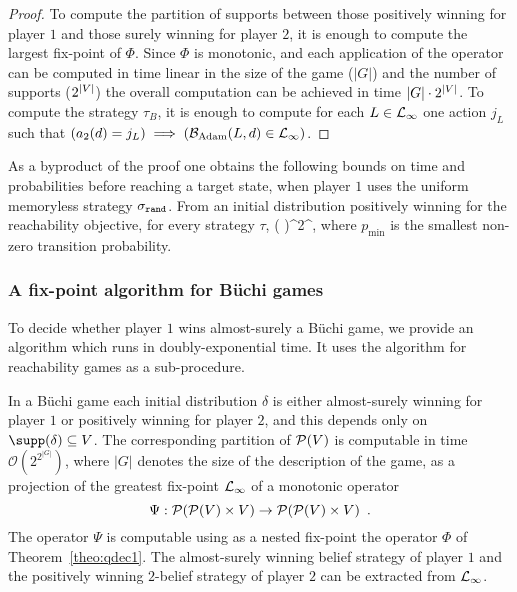 \begin{proof}
To compute
the partition of supports between those positively winning for player $1$
and those surely winning for player $2$,
it is enough to compute
the largest fix-point of $\Phi$.
Since $\Phi$ is monotonic, and each application of the operator
can be computed in time linear in the size of the game ($|G|$)
and the number of supports ($2^{|V|}$)
the overall computation can be achieved in time $|G| \cdot 2^{|V|}$.
To compute the strategy $\tau_B$, it is enough to compute
for each $L\in\mathcal{L}_\infty$ one action $j_L$ such that
$(a_2(d)=j_L)\implies (\mathcal{B}_{\text{Adam}}(L,d)\in\mathcal{L}_\infty)$.
\end{proof}

As a byproduct of the proof one obtains the following bounds on time
and probabilities before reaching a target state, when player $1$ uses
the uniform memoryless strategy $\sigma_{{\tt rand}}$.  From an initial
distribution positively winning for the reachability objective, for
every strategy $\tau$, \be\label{eq:bounds}
\geq \left(
  \right)^{2^{\lvert\states\lvert}}\enspace,
\ee where $p_{\min}$ is the smallest non-zero transition probability.


\subsubsection{A fix-point algorithm for B\"uchi games}

To decide whether player $1$ wins almost-surely a B\"uchi game,
we provide an algorithm which runs in doubly-exponential time.
It uses the algorithm for reachability games as a sub-procedure.


\begin{theorem}
  \label{theo:qdec2} In a B\"uchi game each initial distribution
  $\delta$ is either almost-surely winning for player $1$ or
  positively winning for player $2$, and this depends only on
  $\supp(\delta)\subseteq \states$.
The corresponding partition of $\mathcal{P}(V)$ is computable in
time $\mathcal{O}\left(2^{2^{|G|}}\right)$, where $|G|$ denotes the size of the description of the game,
as a projection of the greatest
fix-point $\mathcal{L}_\infty$
of a monotonic operator
\[\Psi:
\mathcal{P}(\mathcal{P}(V)\times V)
\to
\mathcal{P}(\mathcal{P}(V)\times V)
\enspace.
\]
The operator $\Psi$ is computable using as a nested fix-point the operator $\Phi$ of Theorem~\ref{theo:qdec1}.
 The almost-surely winning belief strategy of player $1$ and the positively winning $2$-belief strategy of player $2$  can be extracted 
from $\mathcal{L}_\infty$.
\end{theorem}

